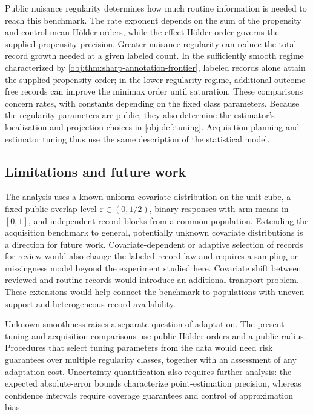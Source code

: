 \documentclass[11pt]{article}
\begin{document}
Public nuisance regularity determines how much routine information is needed to reach this benchmark. The rate exponent depends on the sum of the propensity and control-mean H\"older orders, while the effect H\"older order governs the supplied-propensity precision. Greater nuisance regularity can reduce the total-record growth needed at a given labeled count. In the sufficiently smooth regime characterized by \cref{obj:thm:sharp-annotation-frontier}, labeled records alone attain the supplied-propensity order; in the lower-regularity regime, additional outcome-free records can improve the minimax order until saturation. These comparisons concern rates, with constants depending on the fixed class parameters. Because the regularity parameters are public, they also determine the estimator's localization and projection choices in \cref{obj:def:tuning}. Acquisition planning and estimator tuning thus use the same description of the statistical model.

\subsection{Limitations and future work}

The analysis uses a known uniform covariate distribution on the unit cube, a fixed public overlap level \(\varepsilon\in(0,1/2)\), binary responses with arm means in \([0,1]\), and independent record blocks from a common population. Extending the acquisition benchmark to general, potentially unknown covariate distributions is a direction for future work. Covariate-dependent or adaptive selection of records for review would also change the labeled-record law and requires a sampling or missingness model beyond the experiment studied here. Covariate shift between reviewed and routine records would introduce an additional transport problem. These extensions would help connect the benchmark to populations with uneven support and heterogeneous record availability.

Unknown smoothness raises a separate question of adaptation. The present tuning and acquisition comparisons use public H\"older orders and a public radius. Procedures that select tuning parameters from the data would need risk guarantees over multiple regularity classes, together with an assessment of any adaptation cost. Uncertainty quantification also requires further analysis: the expected absolute-error bounds characterize point-estimation precision, whereas confidence intervals require coverage guarantees and control of approximation bias.
\end{document}
